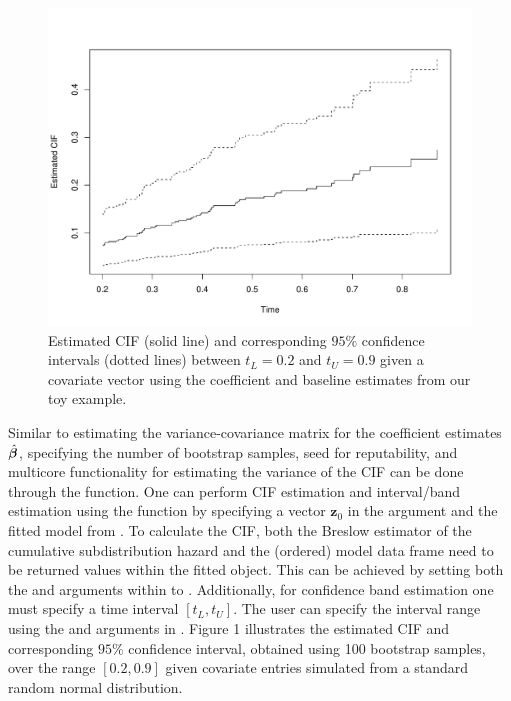  
\begin{figure}[t!]
\label{fig2:cif}
\centering
\includegraphics[scale = 0.6]{plots/new_CIF-eps-converted-to.pdf}
\caption{Estimated CIF (solid line) and corresponding $95\%$ confidence intervals (dotted lines) between $t_L = 0.2$ and $t_U = 0.9$ given a covariate vector  using the coefficient and baseline estimates from our toy example.}
\end{figure}

Similar to estimating the variance-covariance matrix for the coefficient estimates $\hat{\bm \beta}$, specifying the number of bootstrap samples, seed for reputability, and multicore functionality for estimating the variance of the CIF can be done through the  function. One can perform CIF estimation and interval/band estimation using the  function by specifying a vector $\mathbf{z}_0$ in the  argument and the fitted model from . To calculate the CIF, both the Breslow estimator of the cumulative subdistribution hazard and the (ordered) model data frame need to be returned values within the fitted object. This can be achieved by setting both the  and  arguments within  to . Additionally, for confidence band estimation one must specify a time interval $[t_L, t_U]$. The user can specify the interval range using the  and  arguments in . Figure 1 illustrates the estimated CIF and corresponding $95\%$ confidence interval, obtained using 100 bootstrap samples, over the range $[0.2, 0.9]$ given covariate entries  simulated from a standard random normal distribution.

